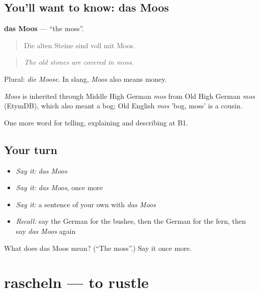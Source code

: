 \subsection*{You'll want to know: das Moos}
\textbf{das Moos} — \textquotedblleft{}the moss\textquotedblright{}.

\begin{quote}
Die alten Steine sind voll mit Moos.
\end{quote}

\begin{quote}
\emph{The old stones are covered in moss.}
\end{quote}

Plural: \emph{die Moose}. In slang, \emph{Moos} also means money.

\begin{cousinweb}
\emph{Moos} is inherited through Middle High German \emph{mos} from Old High German \emph{mos} (EtymDB), which also meant a bog; Old English \emph{mos} 'bog, moss' is a cousin.
\end{cousinweb}

\begin{grammarlens}[title={What you've built}]
One more word for telling, explaining and describing at B1.
\end{grammarlens}

\subsection*{Your turn}
\begin{itemize}
\raggedright
  \item \emph{Say it:} \emph{das Moos}
  \item \emph{Say it:} \emph{das Moos}, once more
  \item \emph{Say it:} a sentence of your own with \emph{das Moos}
  \item \emph{Recall:} say the German for the bushes, then the German for the fern, then say \emph{das Moos} again
\end{itemize}

\begin{tcolorbox}[breakable,colback=teal!4,colframe=teal!35!black,title={Before you move on}]
What does das Moos mean? (\textquotedblleft{}The moss\textquotedblright{}.) Say it once more.
\end{tcolorbox}
\section[rascheln]{rascheln — to rustle}

